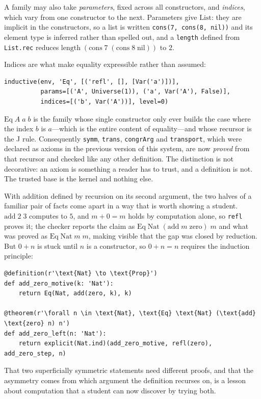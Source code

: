 \documentclass[11pt]{article}
\begin{document}
A family may also take \emph{parameters}, fixed across all constructors, and
\emph{indices}, which vary from one constructor to the next. Parameters give
$\mathrm{List}$: they are implicit in the constructors, so a list is written
\verb|cons(7, cons(8, nil))| and its element type is inferred rather than
spelled out, and a \verb|length| defined from \verb|List.rec| reduces
$\mathrm{length}\;(\mathrm{cons}\;7\;(\mathrm{cons}\;8\;\mathrm{nil}))$ to $2$.

Indices are what make equality expressible rather than assumed:
\begin{lstlisting}
inductive(env, 'Eq', [('refl', [], [Var('a')])],
          params=[('A', Universe(1)), ('a', Var('A'), False)],
          indices=[('b', Var('A'))], level=0)
\end{lstlisting}
$\mathrm{Eq}\;A\;a\;b$ is the family whose single constructor only ever builds
the case where the index $b$ is $a$---which is the entire content of
equality---and whose recursor is the J rule. Consequently
\verb|symm|, \verb|trans|, \verb|congrArg| and \verb|transport|, which were
declared as axioms in the previous version of this system, are now
\emph{proved} from that recursor and checked like any other definition. The
distinction is not decorative: an axiom is something a reader has to trust, and
a definition is not. The trusted base is the kernel and nothing else.

With addition defined by recursion on its second argument, the two halves of a
familiar pair of facts come apart in a way that is worth showing a student.
$\mathrm{add}\;2\;3$ computes to $5$, and $m + 0 = m$ holds by computation
alone, so \verb|refl| proves it; the checker reports the claim as
$\mathrm{Eq}\;\mathrm{Nat}\;(\mathrm{add}\;m\;\mathrm{zero})\;m$ and what was
proved as $\mathrm{Eq}\;\mathrm{Nat}\;m\;m$, making visible that the gap was
closed by reduction. But $0 + n$ is stuck until $n$ is a constructor, so
$0 + n = n$ requires the induction principle:
\begin{lstlisting}
@definition(r'\text{Nat} \to \text{Prop}')
def add_zero_motive(k: 'Nat'):
    return Eq(Nat, add(zero, k), k)

@theorem(r'\forall n \in \text{Nat}, \text{Eq} \text{Nat} (\text{add} \text{zero} n) n')
def add_zero_left(n: 'Nat'):
    return explicit(Nat.ind)(add_zero_motive, refl(zero), add_zero_step, n)
\end{lstlisting}
That two superficially symmetric statements need different proofs, and that the
asymmetry comes from which argument the definition recurses on, is a lesson
about computation that a student can now discover by trying both.
\end{document}
